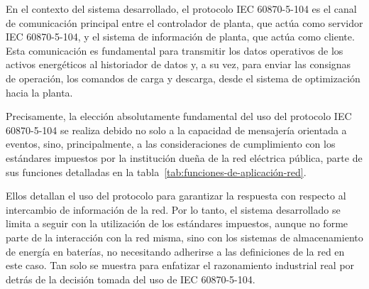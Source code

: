 En el contexto del sistema desarrollado, el protocolo IEC 60870-5-104 es el canal de comunicación principal entre el controlador de planta, que actúa como servidor IEC 60870-5-104, y el sistema de información de planta, que actúa como cliente. Esta comunicación es fundamental para transmitir los datos operativos de los activos energéticos al historiador de datos y, a su vez, para enviar las consignas de operación, los comandos de carga y descarga, desde el sistema de optimización hacia la planta.

Precisamente, la elección absolutamente fundamental del uso del protocolo IEC 60870-5-104 se realiza debido no solo a la capacidad de mensajería orientada a eventos, sino, principalmente, a las consideraciones de cumplimiento con los estándares impuestos por la institución dueña de la red eléctrica pública, parte de sus funciones detalladas en la tabla~\ref{tab:funciones-de-aplicación-red}.

Ellos detallan el uso del protocolo para garantizar la respuesta con respecto al intercambio de información de la red. Por lo tanto, el sistema desarrollado se limita a seguir con la utilización de los estándares impuestos, aunque no forme parte de la interacción con la red misma, sino con los sistemas de almacenamiento de energía en baterías, no necesitando adherirse a las definiciones de la red en este caso. Tan solo se muestra para enfatizar el razonamiento industrial real por detrás de la decisión tomada del uso de IEC 60870-5-104.

